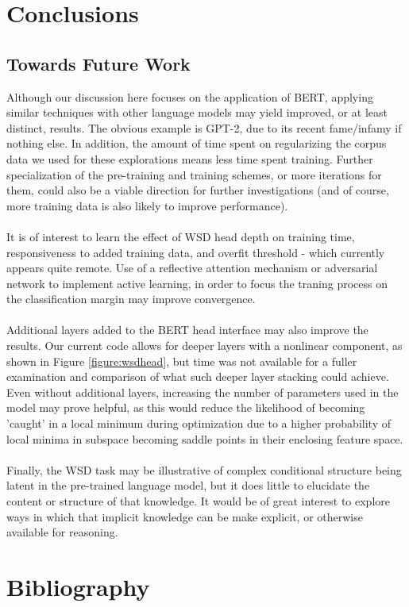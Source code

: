 \documentclass{IEEEtran}
\begin{document}
\section{Conclusions}


\subsection{Towards Future Work}
	Although our discussion here focuses on the application of BERT, applying similar techniques with other language models may yield improved, or at least distinct, results. The obvious example is GPT-2, due to its recent fame/infamy if nothing else. In addition, the amount of time spent on regularizing the corpus data we used for these explorations means less time spent training. Further specialization of the pre-training and training schemes, or more iterations for them, could also be a viable direction for further investigations (and of course, more training data is also likely to improve performance).
	\\ \\
	It is of interest to learn the effect of WSD head depth on training time, responsiveness to added training data, and overfit threshold - which currently appears quite remote.  Use of a reflective attention mechanism or adversarial network to implement active learning, in order to focus the traning process on the classification margin may improve convergence.
	\\ \\
	Additional layers added to the BERT head interface may also improve the results. Our current code allows for deeper layers with a nonlinear component, as shown in Figure \ref{figure:wsdhead}, but time was not available for a fuller examination and comparison of what such deeper layer stacking could achieve. Even without additional layers, increasing the number of parameters used in the model may prove helpful, as this would reduce the likelihood of becoming 'caught' in a local minimum during optimization due to a higher probability of local minima in subspace becoming saddle points in their enclosing feature space.
	\\ \\
	Finally, the WSD task may be illustrative of complex conditional structure being latent in the pre-trained language model, but it does little to elucidate the content or structure of that knowledge.  It would be of great interest to explore ways in which that implicit knowledge can be make explicit, or otherwise available for reasoning.
\section{Bibliography}


\end{document}

